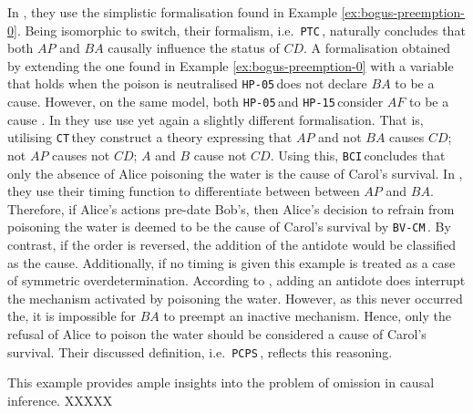 \documentclass[11pt,a4paper]{book}
\theoremstyle{definition}
\theoremstyle{definition}
\newtheorem{example}{Example}[section]
\theoremstyle{definition}
\theoremstyle{remark}
\newcommand{\hpu}{\texttt{HP-05}\,}
\newcommand{\ptc}{\texttt{PTC}\,}
\newcommand{\hpm}{\texttt{HP-15}\,}
\newcommand{\bvcm}{\texttt{BV-CM}\,}
\newcommand{\bci}{\texttt{BCI}\,}
\newcommand{\pcps}{\texttt{PCPS}\,}
\newcommand{\ct}{\texttt{CT}\,}
\begin{document}
In \parencite{weslake2015partial}, they use the simplistic formalisation found in Example \ref{ex:bogus-preemption-0}. 
Being isomorphic to switch, their formalism, i.e.\ \ptc,  naturally concludes that both $AP$ and $BA$ causally influence the status of $CD$.
A formalisation obtained by extending the one found in Example \ref{ex:bogus-preemption-0} with a variable that holds when the poison is neutralised \hpu does not declare $BA$ to be a cause.
However, on the same model, both \hpu and \hpm  consider $AF$ to be a cause \parencite[p.~88]{halpern2016actual}.
In \parencite{bochman2018actual} they use use yet again a slightly different formalisation.
That is, utilising \ct they construct a theory expressing that $AP$ and not $BA$ causes $CD$; not $AP$ causes not $CD$;
$A$ and $B$ cause not $CD$. Using this, \bci concludes that only the absence of Alice poisoning the water is the cause of Carol's survival. In \parencite{beckers2018principled}, they use their timing function to differentiate between between $AP$ and $BA$. Therefore, if Alice's actions pre-date Bob's, then Alice's decision to refrain from poisoning the water is deemed to be the cause of Carol's survival by \bvcm. By contrast, if the order is reversed, the addition of the antidote would be classified as the cause. Additionally, if no timing is given this example is treated as a case of symmetric overdetermination.
According to \parencite{denecker2019explaining}, adding an antidote does interrupt the mechanism activated by poisoning the water. However, as this never occurred the, it is impossible for $BA$ to preempt an inactive mechanism. 
Hence, only the refusal of Alice to poison the water should be considered a cause of Carol's survival.
Their discussed definition, i.e.\ \pcps, reflects this reasoning.


This example provides ample insights into the problem of omission in causal inference. XXXXX




%
%
%  
%  
%	
\end{document}
